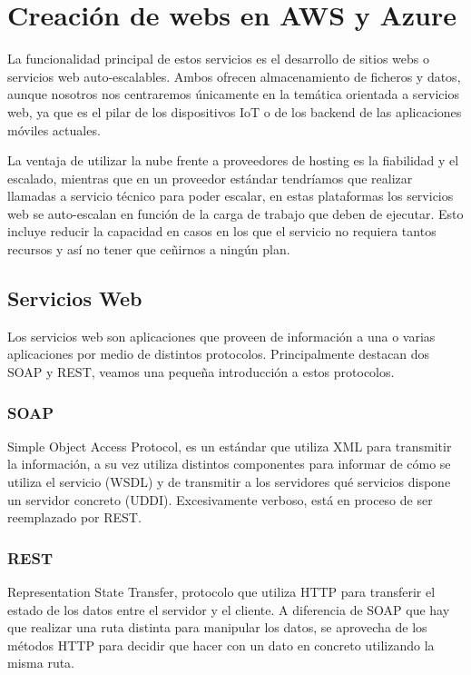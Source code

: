 \chapter{Creación de webs en AWS y Azure}
La funcionalidad principal de estos servicios es el desarrollo de sitios webs o servicios web auto-escalables. Ambos ofrecen almacenamiento de ficheros y datos, aunque nosotros nos centraremos únicamente en la temática orientada a servicios web, ya que es el pilar de los dispositivos IoT o de los backend de las aplicaciones móviles actuales. 

La ventaja de utilizar la nube frente a proveedores de hosting es la fiabilidad y el escalado, mientras que en un proveedor estándar tendríamos que realizar llamadas a servicio técnico para poder escalar, en estas plataformas los servicios web se auto-escalan en función de la carga de trabajo que deben de ejecutar. Esto incluye reducir la capacidad en casos en los que el servicio no requiera tantos recursos y así no tener que ceñirnos a ningún plan.

\section{Servicios Web}
Los servicios web son aplicaciones que proveen de información a una o varias aplicaciones por medio de distintos protocolos. Principalmente destacan dos SOAP y REST, veamos una pequeña introducción a estos protocolos.

\subsection{SOAP}
Simple Object Access Protocol, es un estándar que utiliza XML para transmitir la información, a su vez utiliza distintos componentes para informar de cómo se utiliza el servicio (WSDL) y de transmitir a los servidores qué servicios dispone un servidor concreto (UDDI). Excesivamente verboso, está en proceso de ser reemplazado por REST.

\subsection{REST}
Representation State Transfer, protocolo que utiliza HTTP para transferir el estado de los datos entre el servidor y el cliente. A diferencia de SOAP que hay que realizar una ruta distinta para manipular los datos, se aprovecha de los métodos HTTP para decidir que hacer con un dato en concreto utilizando la misma ruta.

